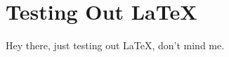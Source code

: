 \documentclass{article}
\begin{document}
\section{Testing Out LaTeX}
Hey there, just testing out LaTeX, don't mind me.
\end{document}
